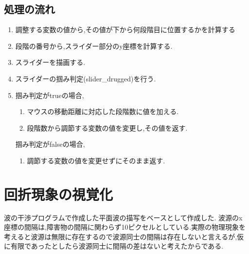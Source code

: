   \subsection{処理の流れ}
\begin{enumerate}

\item 調整する変数の値から,その値が下から何段階目に位置するかを計算する
\item 段階の番号から,スライダー部分のy座標を計算する.
\item スライダーを描画する.
\item スライダーの掴み判定(slider\_drugged)を行う.
\item 掴み判定がtrueの場合,
\begin{enumerate}
\item マウスの移動距離に対応した段階数に値を加える.
\item 段階数から調節する変数の値を変更し,その値を返す.
\end{enumerate}
掴み判定がfalseの場合,
\begin{enumerate}
\item 調節する変数の値を変更せずにそのまま返す.
\end{enumerate}
\end{enumerate}

\section{回折現象の視覚化}
波の干渉プログラムで作成した平面波の描写をベースとして作成した.
波源のx座標の間隔は,障害物の間隔に関わらず10ピクセルとしている.実際の物理現象を考えると波源は無限に存在するので波源同士の間隔は存在しないと言えるが,仮に有限であったとしたら波源同士に間隔の差はないと考えたからである.















